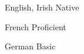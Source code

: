 

\begin{cvskills}

  \cvskill
    {English, Irish} %
    {Native} %

  \cvskill
    {French} %
    {Proficient} %

  \cvskill
    {German} %
    {Basic} %

\end{cvskills}
